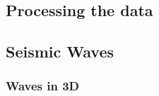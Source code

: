 \subsection{Processing the data}


\subsection{Seismic Waves}


\subsubsection{Waves in 3D}



















